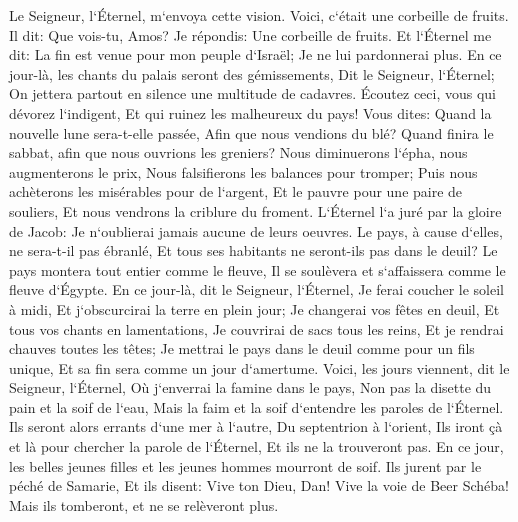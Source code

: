 \verse Le Seigneur, l`Éternel, m`envoya cette vision. Voici, c`était une corbeille de fruits. 
\verse Il dit: Que vois-tu, Amos? Je répondis: Une corbeille de fruits. Et l`Éternel me dit: La fin est venue pour mon peuple d`Israël; Je ne lui pardonnerai plus. 
\verse En ce jour-là, les chants du palais seront des gémissements, Dit le Seigneur, l`Éternel; On jettera partout en silence une multitude de cadavres. 
\verse Écoutez ceci, vous qui dévorez l`indigent, Et qui ruinez les malheureux du pays! 
\verse Vous dites: Quand la nouvelle lune sera-t-elle passée, Afin que nous vendions du blé? Quand finira le sabbat, afin que nous ouvrions les greniers? Nous diminuerons l`épha, nous augmenterons le prix, Nous falsifierons les balances pour tromper; 
\verse Puis nous achèterons les misérables pour de l`argent, Et le pauvre pour une paire de souliers, Et nous vendrons la criblure du froment. 
\verse L`Éternel l`a juré par la gloire de Jacob: Je n`oublierai jamais aucune de leurs oeuvres. 
\verse Le pays, à cause d`elles, ne sera-t-il pas ébranlé, Et tous ses habitants ne seront-ils pas dans le deuil? Le pays montera tout entier comme le fleuve, Il se soulèvera et s`affaissera comme le fleuve d`Égypte. 
\verse En ce jour-là, dit le Seigneur, l`Éternel, Je ferai coucher le soleil à midi, Et j`obscurcirai la terre en plein jour; 
\verse Je changerai vos fêtes en deuil, Et tous vos chants en lamentations, Je couvrirai de sacs tous les reins, Et je rendrai chauves toutes les têtes; Je mettrai le pays dans le deuil comme pour un fils unique, Et sa fin sera comme un jour d`amertume. 
\verse Voici, les jours viennent, dit le Seigneur, l`Éternel, Où j`enverrai la famine dans le pays, Non pas la disette du pain et la soif de l`eau, Mais la faim et la soif d`entendre les paroles de l`Éternel. 
\verse Ils seront alors errants d`une mer à l`autre, Du septentrion à l`orient, Ils iront çà et là pour chercher la parole de l`Éternel, Et ils ne la trouveront pas. 
\verse En ce jour, les belles jeunes filles et les jeunes hommes mourront de soif. 
\verse Ils jurent par le péché de Samarie, Et ils disent: Vive ton Dieu, Dan! Vive la voie de Beer Schéba! Mais ils tomberont, et ne se relèveront plus. 

\chapter{}

